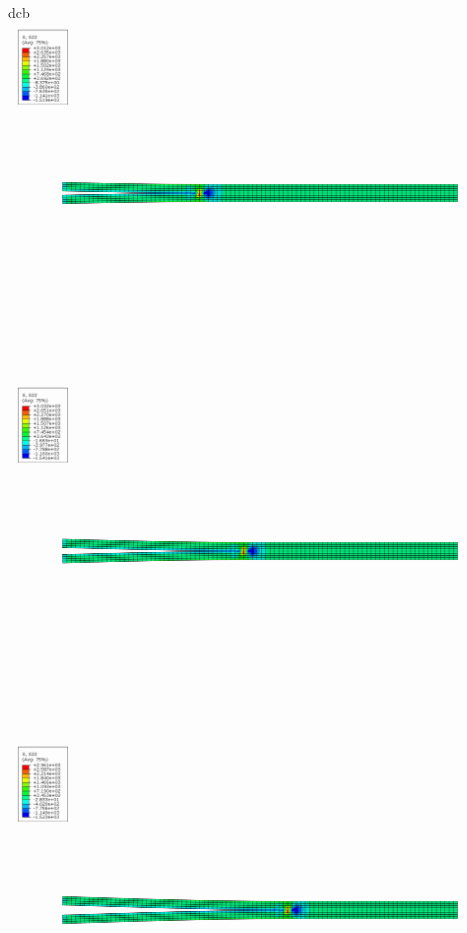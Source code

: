 \documentclass[
  letterpaper,
  ignorenonframetext,
  aspectratio=43,
  handout,
  12pt]{beamer}
\let\Oldincludegraphics\includegraphics
\renewcommand{\includegraphics}[2][]{\Oldincludegraphics[width=\textwidth,height=0.7\textheight,keepaspectratio]{#2}}
\begin{document}
\begin{frame}{dcb}
\includegraphics{../images/dcb6.png}

\includegraphics{../images/dcb7.png}

\includegraphics{../images/dcb8.png}


\end{frame}
\end{document}
